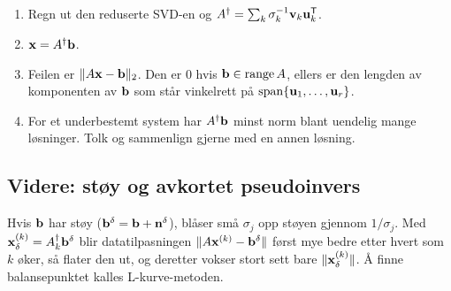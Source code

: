 \begin{oppskrift}
\begin{enumerate}
  \item Regn ut den reduserte SVD-en og $A^\dagger=\sum_k\sigma_k^{-1}\mathbf{v}_k\mathbf{u}_k^{\mathsf{T}}$.
  \item $\mathbf{x}=A^\dagger\mathbf{b}$.
  \item Feilen er $\lVert A\mathbf{x}-\mathbf{b}\rVert_2$. Den er $0$ hvis $\mathbf{b}\in\operatorname{range} A$, ellers er den lengden av komponenten av $\mathbf{b}$ som står vinkelrett på $\operatorname{span}\{\mathbf{u}_1,\dots,\mathbf{u}_r\}$.
  \item For et underbestemt system har $A^\dagger\mathbf{b}$ minst norm blant uendelig mange løsninger. Tolk og sammenlign gjerne med en annen løsning.
\end{enumerate}
\end{oppskrift}

\subsection{Videre: støy og avkortet pseudoinvers}
Hvis $\mathbf{b}$ har støy ($\mathbf{b}^\delta=\mathbf{b}+\mathbf{n}^\delta$), blåser små $\sigma_j$ opp støyen gjennom $1/\sigma_j$. Med $\mathbf{x}^{(k)}_\delta=A_k^\dagger\mathbf{b}^\delta$ blir datatilpasningen $\lVert A\mathbf{x}^{(k)}-\mathbf{b}^\delta\rVert$ først mye bedre etter hvert som $k$ øker, så flater den ut, og deretter vokser stort sett bare $\lVert \mathbf{x}^{(k)}_\delta\rVert$. Å finne balansepunktet kalles L-kurve-metoden.


